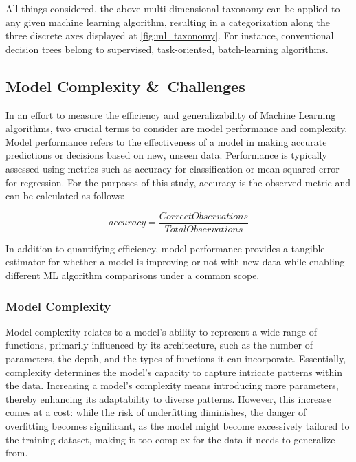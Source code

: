 All things considered, the above multi-dimensional taxonomy can be applied to any given machine learning algorithm, resulting in a categorization along the three
discrete axes displayed at \cref{fig:ml_taxonomy}. For instance, conventional decision trees belong to supervised, task-oriented, batch-learning algorithms.

\subsection{Model Complexity \&\ Challenges}
In an effort to measure the efficiency and generalizability of Machine Learning algorithms, two crucial terms to consider are model performance and complexity.
Model performance refers to the effectiveness of a model in making accurate predictions or decisions based on new, unseen data\cite{perez_model_performance_2022}.
Performance is typically assessed using metrics such as accuracy for classification or mean squared error for regression. For the purposes of this study, accuracy
is the observed metric and can be calculated as follows:

\begin{equation}
    accuracy = \frac{Correct Observations}{Total Observations}
    \label{eq:accuracy}
\end{equation}

In addition to quantifying efficiency, model performance provides a tangible estimator for whether a model is improving or not with new data while enabling different
ML algorithm comparisons under a common scope.

\subsubsection{Model Complexity}
Model complexity relates to a model's ability to represent a wide range of functions, primarily influenced by its architecture,
such as the number of parameters, the depth, and the types of functions it can incorporate. Essentially, complexity determines
the model's capacity to capture intricate patterns within the data. Increasing a model's complexity means introducing more parameters,
thereby enhancing its adaptability to diverse patterns. However, this increase comes at a cost: while the risk of underfitting diminishes,
the danger of overfitting becomes significant, as the model might become excessively tailored to the training dataset, making it too
complex for the data it needs to generalize from\cite{zhang_overfitting_2019,perezModelComplexityMachine2022}.

